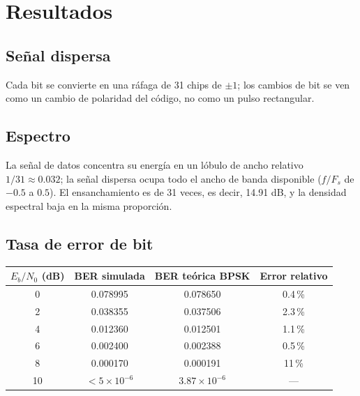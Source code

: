 \documentclass[11pt,a4paper]{article}
\begin{document}
\section{Resultados}

\subsection{Señal dispersa}


Cada bit se convierte en una ráfaga de 31 chips de $\pm1$; los cambios de bit se ven como
un cambio de polaridad del código, no como un pulso rectangular.

\subsection{Espectro}


La señal de datos concentra su energía en un lóbulo de ancho relativo
$1/31\approx0.032$; la señal dispersa ocupa todo el ancho de banda disponible
($f/F_s$ de $-0.5$ a $0.5$). El ensanchamiento es de 31 veces, es decir, 14.91 dB, y la
densidad espectral baja en la misma proporción.

\subsection{Tasa de error de bit}

\begin{tabular}{@{}cccc@{}}
  \toprule
  $E_b/N_0$ (dB) & BER simulada & BER teórica BPSK & Error relativo \\
  \midrule
  0  & 0.078995 & 0.078650 & 0.4\,\% \\
  2  & 0.038355 & 0.037506 & 2.3\,\% \\
  4  & 0.012360 & 0.012501 & 1.1\,\% \\
  6  & 0.002400 & 0.002388 & 0.5\,\% \\
  8  & 0.000170 & 0.000191 & 11\,\% \\
  10 & $<5\times10^{-6}$ & $3.87\times10^{-6}$ & --- \\
  \bottomrule
\end{tabular}

\end{document}
